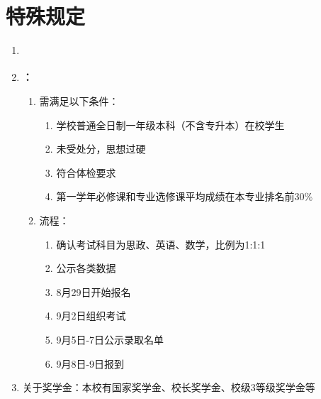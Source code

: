 \section[特殊规定]{特殊规定}
\begin{enumerate}
    \item \textbf{}
    \item \textbf{\footnotemark：}
          \begin{enumerate}
              \item 需满足以下条件：
                    \begin{enumerate}
                        \item 学校普通全日制一年级本科（不含专升本）在校学生
                        \item 未受处分，思想过硬
                        \item 符合体检要求
                        \item 第一学年必修课和专业选修课平均成绩在本专业排名前30\%
                    \end{enumerate}
              \item 流程：
                    \begin{enumerate}
                        \item 确认考试科目为思政、英语、数学，比例为1:1:1
                        \item 公示各类数据
                        \item 8月29日开始报名
                        \item 9月2日组织考试
                        \item 9月5日-7日公示录取名单\footnotemark
                        \item 9月8日-9日报到
                    \end{enumerate}
          \end{enumerate}
    \item 关于奖学金\footnotemark：本校有国家奖学金、校长奖学金、校级3等级奖学金等

\end{enumerate}
